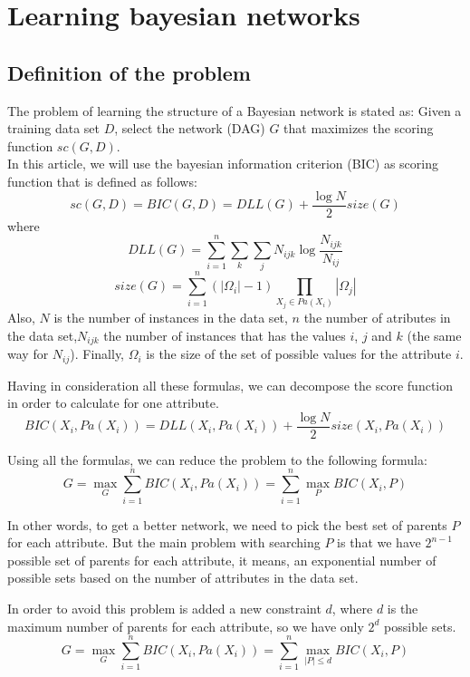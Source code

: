 \section{Learning bayesian networks}
\label{sec:learning}

\subsection{Definition of the problem}
\label{subsec:definition}

The problem of learning the structure of a Bayesian network is stated as: Given a training data set $D $, select the network (DAG) $G$ that maximizes the scoring function ${sc}( G , D )$.\\
In this article, we will use the bayesian information criterion (BIC) as scoring function that is defined as follows:
	\[ {sc}( G , D ) = {BIC}( G , D ) = {DLL}( G ) + \frac{\log N}{2} {size}( G ) \]
where
	\[ {DLL}( G ) = \sum_{i=1}^{n} \sum_{k} \sum_{j} N_{ijk} \log \frac{N_{ijk}}{N_{ij}} \]
	\[ {size}( G ) = \sum_{i=1}^{n} ( |\Omega_i| - 1 ) \prod_{X_j \in {Pa}( X_i )} |\Omega_j| \]
Also, $N$ is the number of instances in the data set, $n$ the number of atributes in the data set,$N_{ijk}$ the number of instances that has the values $i$, $j$ and $k$ (the same way for $N_{ij}$). Finally, $\Omega_i$ is the size of the set of possible values for the attribute $i$.

Having in consideration all these formulas, we can decompose the score function in order to calculate for one attribute.
	\[ {BIC}( X_i , {Pa}( X_i ) ) = {DLL}( X_i , {Pa}( X_i ) ) + \frac{\log N}{2} {size}( X_i , {Pa}( X_i ) ) \]

Using all the formulas, we can reduce the problem to the following formula:
	\[ G = \max_G \sum_{i=1}^{n} {BIC}( X_i , {Pa}( X_i ) ) = \sum_{i=1}^{n} \max_P {BIC}( X_i , P ) \]

In other words, to get a better network, we need to pick the best set of parents $P$ for each attribute. But the main problem with searching $P$ is that we have $2^{n-1}$ possible set of parents for each attribute, it means, an exponential number of possible sets based on the number of attributes in the data set.

In order to avoid this problem is added a new constraint $d$, where $d$ is the maximum number of parents for each attribute, so we have only $2^d$ possible sets.
	\[ G = \max_G \sum_{i=1}^{n} {BIC}( X_i , {Pa}( X_i ) ) = \sum_{i=1}^{n} \max_{|P|\leq d} {BIC}( X_i , P ) \]

